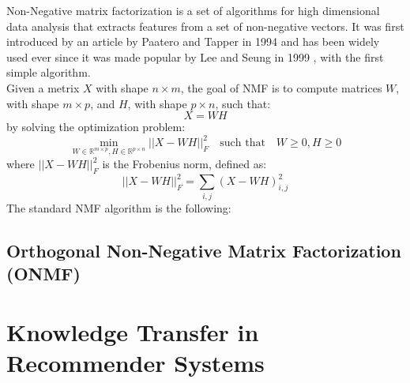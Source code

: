 Non-Negative matrix factorization is a set of algorithms for high dimensional data analysis that extracts features from a set of non-negative vectors. It was first introduced by an article by Paatero and Tapper in 1994 \cite{10.1002/env.3170050203} and has been widely used ever since it was made popular by Lee and Seung in 1999 \cite{10.1038/44565}, with the first simple algorithm.\\
Given a metrix $X$ with shape $n \times m$, the goal of NMF is to compute matrices $W$, with shape $m \times p$, and $H$, with shape $p \times n$, such that:
\begin{equation*}
X = WH
\end{equation*}
by solving the optimization problem:
\begin{equation*}
\min_{W \in \mathbb{R}^{m \times p}, H \in \mathbb{R}^{p \times n}} ||X - WH||^2_F\quad \text{such that}\quad W \geq 0, H \geq 0
\end{equation*}
where $||X - WH||^2_F$ is the Frobenius norm, defined as:
\begin{equation*}
||X - WH||^2_F = \sum_{i,j} (X - WH)^2_{i,j}
\end{equation*}
The standard NMF algorithm is the following:


\subsection{Orthogonal Non-Negative Matrix Factorization (ONMF)}


\section{Knowledge Transfer in Recommender Systems}